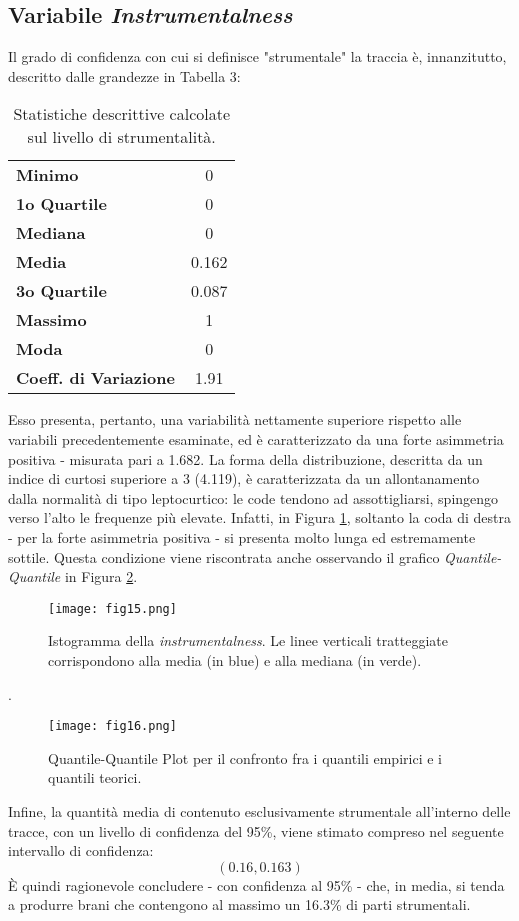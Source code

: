 \documentclass[fleqn,10pt]{SelfArx} %
\begin{document}
\subsection*{Variabile \textit{Instrumentalness}}
Il grado di confidenza con cui si definisce "strumentale" la traccia è, innanzitutto, descritto dalle grandezze in Tabella 3:
{\begin{table}[H]
\centering

\begin{tabular}[t]{lc}
\toprule
\midrule
\textbf{Minimo}&0\\
\textbf{1o Quartile}&0\\
\textbf{Mediana}&0\\
\textbf{Media}&0.162\\
\textbf{3o Quartile}&0.087\\
\textbf{Massimo}&1\\
\textbf{Moda}&0\\
\textbf{Coeff. di Variazione}&1.91\\
\bottomrule
\end{tabular}
\caption{Statistiche descrittive calcolate sul livello di strumentalità.}
\end{table}}
Esso presenta, pertanto, una variabilità nettamente superiore rispetto alle variabili precedentemente esaminate, ed è caratterizzato da una forte asimmetria positiva - misurata pari a 1.682. La forma della distribuzione, descritta da un indice di curtosi superiore a 3 (4.119), è caratterizzata da un allontanamento dalla normalità di tipo leptocurtico: le code tendono ad assottigliarsi, spingengo verso l'alto le frequenze più elevate. Infatti, in Figura \ref{fig:fig15}, soltanto la coda di destra - per la forte asimmetria positiva - si presenta molto lunga ed estremamente sottile. Questa condizione viene riscontrata anche osservando il grafico \textit{Quantile-Quantile} in Figura \ref{fig:fig16}.
\begin{figure}[H]
    \centering
    \texttt{[image: fig15.png]}
    \label{fig:fig15}
    \caption{Istogramma della \textit{instrumentalness}. Le linee verticali tratteggiate corrispondono alla media (in blue) e alla mediana (in verde).}
\end{figure}. 
\begin{figure}[H]
    \centering
    \texttt{[image: fig16.png]}
    \label{fig:fig16}
    \caption{Quantile-Quantile Plot per il confronto fra i quantili empirici e i quantili teorici.}
\end{figure}
Infine, la quantità media di contenuto esclusivamente strumentale all'interno delle tracce, con un livello di confidenza del 95\%, viene stimato compreso nel seguente intervallo di confidenza:
\begin{equation}
    (0.16,0.163)
\end{equation}
È quindi ragionevole concludere - con confidenza al 95\% - che, in media, si tenda a produrre brani che contengono al massimo un 16.3\% di parti strumentali.
\end{document}
